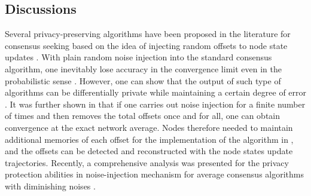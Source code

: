 \documentclass[a4paper, 11pt]{article}
\newcommand{\1}{\mathbf{1}}
\newcommand{\betab}{\bm{\beta}}
\newcommand{\Sigmab}{\bm{\Sigma}}
\begin{document}

\subsection{Discussions}
Several privacy-preserving algorithms have been proposed in the literature for consensus seeking based on the idea of injecting random offsets to node state updates \cite{Kefayati2007,huang2012differentially,manitara2013privacy,mo2017privacy}. With plain  random noise injection into the standard consensus algorithm, one inevitably lose accuracy in the convergence limit even in the probabilistic sense \cite{Kefayati2007}. However, one can show that the output of such type of algorithms can be differentially private while maintaining a certain degree of error \cite{huang2012differentially}. It was further shown in \cite{manitara2013privacy} that if one  carries out noise injection for a finite number of times and then removes the total offsets once and for all, one can obtain convergence at the exact network average. Nodes therefore needed to maintain additional memories of each  offset for the implementation of  the algorithm in \cite{manitara2013privacy}, and the offsets can be detected and reconstructed with the node states update trajectories. Recently, a comprehensive analysis was presented for the privacy protection abilities in noise-injection mechanism for average consensus algorithms with diminishing noises \cite{mo2017privacy}.
\end{document}
